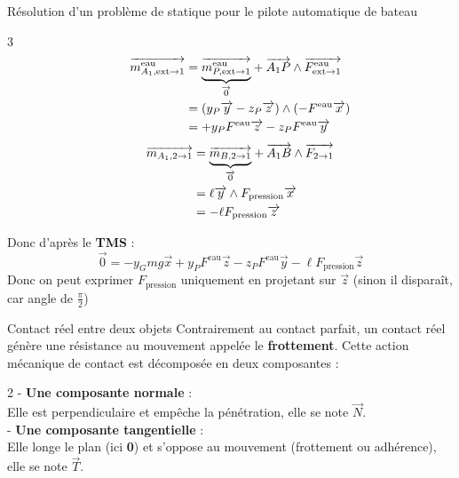 \documentclass{article} %
\begin{document}
{\begin{exemple}{Résolution d'un problème de 
statique pour le pilote automatique de bateau}
\begin{multicols}{3}
\noindent \begin{align*}
\hspace*{15pt}\overrightarrow{m_{{A_1},\text{ext}\to1}^\text{eau}}&=\underset{\overrightarrow{0}}{\underbrace{\overrightarrow{m_{P,\text{ext}\to 1}^\text{eau}}}}+\overrightarrow{A_1P}\wedge\overrightarrow{F^\text{eau}_{\text{ext}\to1}}\\
&=(y_P\overrightarrow{y}-z_P\overrightarrow{z})\wedge(-F^\text{eau}\overrightarrow{x})\\
&=+y_PF^\text{eau}\overrightarrow{z}-z_PF^\text{eau}\overrightarrow{y}
\end{align*}
\begin{align*}
\hspace*{15pt}\overrightarrow{m_{{A_1},2\to1}}&=\underset{\overrightarrow{0}}{\underbrace{\overrightarrow{m_{B,2\to 
1}}}}+\overrightarrow{A_1B}\wedge\overrightarrow{F_{2\to1}}\\
&=\ell\overrightarrow{y}\wedge F_\text{pression}\overrightarrow{x}\\
&=-\ell F_\text{pression}\overrightarrow{z}
\end{align*}
\end{multicols}
Donc d'après le \textbf{TMS} :
$$\overrightarrow{0}=-y_Gmg\overrightarrow{x}+y_PF^\text{eau}\overrightarrow{z}-z_PF^\text{eau}\overrightarrow{y}-\ell F_\text{pression}\overrightarrow{z}$$
Donc on peut exprimer $F_{\text{pression}}$ uniquement en projetant sur $\overrightarrow{z}$ (sinon il disparaît, car angle de $\frac{\pi}{2}$)\\
\begin{center}
\end{center}
\end{exemple}
{}
\begin{definition}{Contact réel entre deux objets}
Contrairement au contact parfait, un contact réel génère une résistance au mouvement appelée le \textbf{frottement}.
Cette action mécanique de contact est décomposée en deux composantes :\vspace*{-7pt}
\begin{multicols}{2}
\noindent
- \textbf{Une composante normale} :\\
Elle est perpendiculaire et empêche la pénétration, elle se note $\overrightarrow{N}$.\\
- \textbf{Une composante tangentielle} :\\
Elle longe le plan (ici \textbf{0}) et s'oppose au mouvement (frottement ou adhérence), elle se note $\overrightarrow{T}$.\\

\end{multicols}
\end{definition}}
\end{document}
